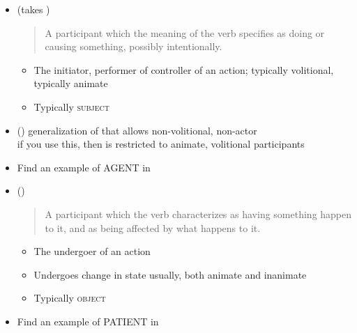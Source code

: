 \documentclass[a4paper,landscape,headrule,footrule,xetex]{foils}
\begin{document}
\begin{itemize}
\item {} (takes )
  \begin{quote}
    A participant which the meaning of the verb specifies as doing or causing something,
    possibly intentionally. 
  \end{quote}
  \begin{itemize}
  \item The initiator, performer of controller of an action; typically volitional, typically animate
  \item Typically \textsc{subject}
  \end{itemize}
  \begin{exe}
      \ex{}
      \ex{}
      \ex{}
    \end{exe}
\item () generalization of  that allows non-volitional, non-actor
  \\ if you use this, then  is restricted to animate, volitional participants
\item Find an example of AGENT in \Story{}\task
\newpage
\item  {} ()
  \begin{quote}
    A participant which the verb characterizes as having something
    happen to it, and as being affected by what happens to it.
  \end{quote}
  \begin{itemize}
  \item The undergoer of an action
  \item  Undergoes change in state usually, both animate and 
    inanimate
  \item Typically \textsc{object}
  \end{itemize}
  \begin{exe}
    \ex{}
    \ex{}
    \ex{}
    \ex{}
  \end{exe}
\item Find an example of PATIENT in \Story{}\task

\end{itemize}
\end{document}
